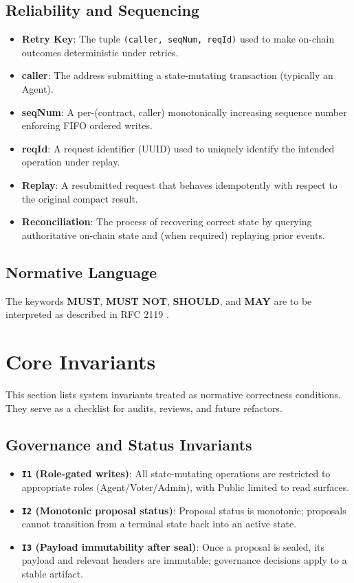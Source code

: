 \documentclass[10pt]{article}
\begin{document}
\subsection{Reliability and Sequencing}
\begin{itemize}
    \item \textbf{Retry Key}: The tuple \texttt{(caller, seqNum, reqId)} used to make on-chain outcomes deterministic under retries.
    \item \textbf{caller}: The address submitting a state-mutating transaction (typically an Agent).
    \item \textbf{seqNum}: A per-(contract, caller) monotonically increasing sequence number enforcing FIFO ordered writes.
    \item \textbf{reqId}: A request identifier (UUID) used to uniquely identify the intended operation under replay.
    \item \textbf{Replay}: A resubmitted request that behaves idempotently with respect to the original compact result.
    \item \textbf{Reconciliation}: The process of recovering correct state by querying authoritative on-chain state and (when required) replaying prior events.
\end{itemize}

\subsection{Normative Language}
The keywords \textbf{MUST}, \textbf{MUST NOT}, \textbf{SHOULD}, and \textbf{MAY} are to be interpreted as described in RFC 2119 \cite{rfc_2119}.

\section{Core Invariants}

This section lists system invariants treated as normative correctness conditions. They serve as a checklist for audits, reviews, and future refactors.

\subsection{Governance and Status Invariants}
\begin{itemize}
    \item \textbf{\texttt{I1} (Role-gated writes)}: All state-mutating operations are restricted to appropriate roles (Agent/Voter/Admin), with Public limited to read surfaces.

    \item \textbf{\texttt{I2} (Monotonic proposal status)}: Proposal status is monotonic; proposals cannot transition from a terminal state back into an active state.

    \item \textbf{\texttt{I3} (Payload immutability after seal)}: Once a proposal is sealed, its payload and relevant headers are immutable; governance decisions apply to a stable artifact.
\end{itemize}
\end{document}
